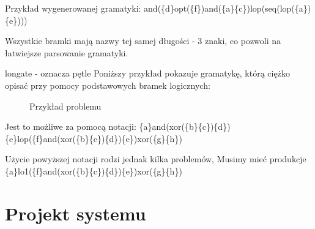Przykład wygenerowanej gramatyki:
and(\{d\}opt(\{f\})and(\{a\}\{c\})lop(seq(lop(\{a\})\{e\})))

Wszystkie bramki mają nazwy tej samej długości - 3 znaki, co pozwoli na łatwiejsze parsowanie gramatyki.

longate - oznacza pętle 
Poniższy przykład pokazuje gramatykę, którą ciężko opisać przy pomocy podstawowych bramek logicznych: 
\begin{figure}[h]
	\caption{\label{fig:subcaption_example}Przykład problemu}
\end{figure}

Jest to możliwe za pomocą notacji: 
\{a\}and(xor(\{b\}\{c\})\{d\})\{e\}lop(\{f\}and(xor(\{b\}\{c\})\{d\})\{e\})xor(\{g\}\{h\})

Użycie powyższej notacji rodzi jednak kilka problemów, Musimy mieć produkcje 
\{a\}lo1(\{f\}and(xor(\{b\}\{c\})\{d\})\{e\})xor(\{g\}\{h\})
\clearpage

\section{Projekt systemu}

